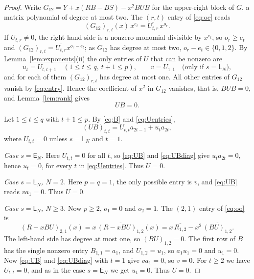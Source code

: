 \documentclass[11pt]{amsart}
\theoremstyle{definition}
\theoremstyle{remark}
\numberwithin{equation}{section}
\newcommand{\sL}{\mathsf{L}}
\newcommand{\sE}{\mathsf{E}}
\newcommand{\conj}[1]{\overline{#1}}
\begin{document}
\begin{proof}
Write $G_{12}=Y+x(RB-BS)-x^2BUB$ for the upper-right block of $G$, a
matrix polynomial of degree at most two. The $(r,t)$ entry of
\eqref{eq:oe} reads
\begin{equation}\label{eq:entry}
(G_{12})_{r,t}(x)\,x^{e_t}=\conj{U_{t,r}}\,x^{o_r}.
\end{equation}
If $U_{t,r}\ne0$, the right-hand side is a nonzero monomial divisible by
$x^{e_t}$, so $o_r\ge e_t$ and $(G_{12})_{r,t}=\conj{U_{t,r}}x^{o_r-e_t}$;
as $G_{12}$ has degree at most two, $o_r-e_t\in\{0,1,2\}$. By
Lemma~\ref{lem:exponents}(ii) the only entries of $U$ that can be nonzero
are
\begin{equation}\label{eq:Uentries}
u_t=U_{t,t+1}\quad(1\le t\le q,\ t+1\le p),\qquad
v=U_{1,1}\quad\text{(only if $s=\sL_N$)},
\end{equation}
and for each of them $(G_{12})_{r,t}$ has degree at most one. All other
entries of $G_{12}$ vanish by \eqref{eq:entry}. Hence the coefficient of
$x^2$ in $G_{12}$ vanishes, that is, $BUB=0$, and Lemma~\ref{lem:rank}
gives
\begin{equation}\label{eq:UB}
UB=0.
\end{equation}

Let $1\le t\le q$ with $t+1\le p$. By \eqref{eq:B} and
\eqref{eq:Uentries},
\begin{equation}\label{eq:UBdiag}
(UB)_{t,t}=U_{t,t}a_{2t-1}+u_ta_{2t},
\end{equation}
where $U_{t,t}=0$ unless $s=\sL_N$ and $t=1$.

\emph{Case $s=\sE_N$.} Here $U_{t,t}=0$ for all $t$, so \eqref{eq:UB} and
\eqref{eq:UBdiag} give $u_ta_{2t}=0$, hence $u_t=0$, for every $t$ in
\eqref{eq:Uentries}. Thus $U=0$.

\emph{Case $s=\sL_N$, $N=2$.} Here $p=q=1$, the only possible entry is $v$,
and \eqref{eq:UB} reads $va_1=0$. Thus $U=0$.

\emph{Case $s=\sL_N$, $N\ge3$.} Now $p\ge2$, $o_1=0$ and $o_2=1$. The
$(2,1)$ entry of \eqref{eq:oo} is
\[
(R-xBU)_{2,1}(x)=x\,\conj{(R-xBU)_{1,2}}(x)
=x\,\conj{R_{1,2}}-x^2\,\conj{(BU)_{1,2}}.
\]
The left-hand side has degree at most one, so $(BU)_{1,2}=0$. The first row
of $B$ has the single nonzero entry $B_{1,1}=a_1$, and $U_{1,2}=u_1$, so
$a_1u_1=0$ and $u_1=0$. Now \eqref{eq:UB} and \eqref{eq:UBdiag} with $t=1$
give $va_1=0$, so $v=0$. For $t\ge2$ we have $U_{t,t}=0$, and as in the case
$s=\sE_N$ we get $u_t=0$. Thus $U=0$.
\end{proof}
\end{document}
